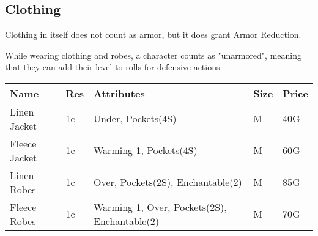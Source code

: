 \subsection{Clothing}\label{subsec:clothing}

Clothing in itself does not count as armor, but it does grant Armor Reduction.

While wearing clothing and robes, a character counts as "unarmored", meaning that they can add their level to rolls for defensive actions.

\begin{longtable}{p{3cm} | p{1.5cm} | p{5cm} | p{1cm} | p{1.5cm}}
	Name & Res &   Attributes & Size & Price\\ \hline
	Linen Jacket & 1c & Under, Pockets(4S) & M & 40G\\
	
	Fleece Jacket & 1c & Warming 1, Pockets(4S) & M & 60G\\
	
	Linen Robes & 1c & Over, Pockets(2S), Enchantable(2) & M & 85G\\
	
	Fleece Robes & 1c & Warming 1, Over, Pockets(2S), Enchantable(2)  & M & 70G\\
\end{longtable}
